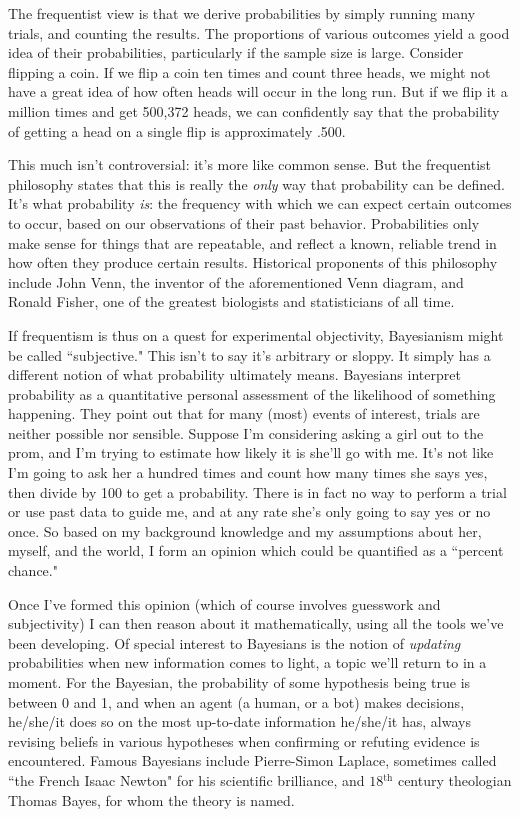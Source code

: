 The frequentist view is that we derive probabilities by simply running many
trials, and counting the results. The proportions of various outcomes yield
a good idea of their probabilities, particularly if the sample size is
large. Consider flipping a coin. If we flip a coin ten times and count
three heads, we might not have a great idea of how often heads will occur
in the long run. But if we flip it a million times and get 500,372 heads,
we can confidently say that the probability of getting a head on a single
flip is approximately .500.

This much isn't controversial: it's more like common sense. But the
frequentist philosophy states that this is really the \textit{only} way
that probability can be defined. It's what probability \textit{is}: the
frequency with which we can expect certain outcomes to occur, based on our
observations of their past behavior. Probabilities only make sense for
things that are repeatable, and reflect a known, reliable trend in how
often they produce certain results. Historical proponents of this
philosophy include John Venn, the inventor of the aforementioned Venn
diagram, and Ronald Fisher, one of the greatest biologists and
statisticians of all time.

If frequentism is thus on a quest for experimental objectivity, Bayesianism
might be called ``subjective." This isn't to say it's arbitrary or sloppy.
It simply has a different notion of what probability ultimately means.
Bayesians interpret probability as a quantitative personal assessment of
the likelihood of something happening. They point out that for many (most)
events of interest, trials are neither possible nor sensible. Suppose I'm
considering asking a girl out to the prom, and I'm trying to estimate how
likely it is she'll go with me. It's not like I'm going to ask her a
hundred times and count how many times she says yes, then divide by 100 to
get a probability. There is in fact no way to perform a trial or use past
data to guide me, and at any rate she's only going to say yes or no once.
So based on my background knowledge and my assumptions about her, myself,
and the world, I form an opinion which could be quantified as a ``percent
chance."

Once I've formed this opinion (which of course involves guesswork and
subjectivity) I can then reason about it mathematically, using all the
tools we've been developing. Of special interest to Bayesians is the notion
of \textit{updating} probabilities when new information comes to light, a
topic we'll return to in a moment. For the Bayesian, the probability of
some hypothesis being true is between 0 and 1, and when an agent (a human,
or a bot) makes decisions, he/she/it does so on the most up-to-date
information he/she/it has, always revising beliefs in various hypotheses
when confirming or refuting evidence is encountered. Famous Bayesians
include Pierre-Simon Laplace, sometimes called ``the French Isaac Newton"
for his scientific brilliance, and $18{^{\text{th}}}$ century theologian
Thomas Bayes, for whom the theory is named.

